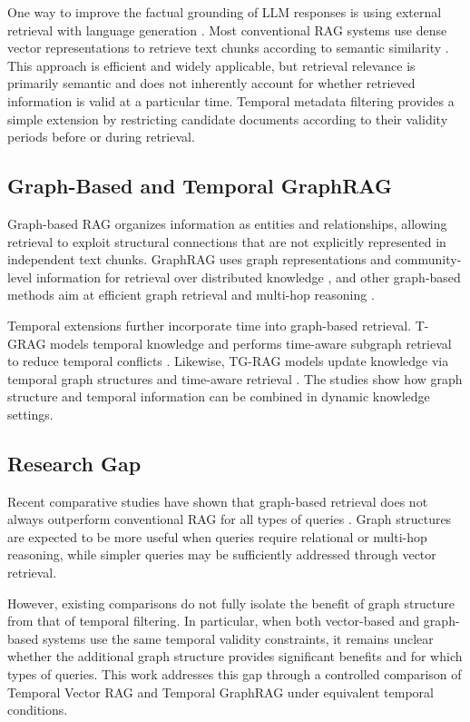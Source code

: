 \documentclass[conference]{IEEEtran}
\numberwithin{equation}{section}
\begin{document}
One way to improve the factual grounding of LLM responses is using external retrieval with language generation \cite{Lewis2020}. Most conventional RAG systems use dense vector representations to retrieve text chunks according to semantic similarity \cite{Gao2023}. This approach is efficient and widely applicable, but retrieval relevance is primarily semantic and does not inherently account for whether retrieved information is valid at a particular time. Temporal metadata filtering provides a simple extension by restricting candidate documents according to their validity periods before or during retrieval.

\subsection{Graph-Based and Temporal GraphRAG}

Graph-based RAG organizes information as entities and relationships, allowing retrieval to exploit structural connections that are not explicitly represented in independent text chunks. GraphRAG uses graph representations and community-level information for retrieval over distributed knowledge \cite{Edge2024}, and other graph-based methods aim at efficient graph retrieval and multi-hop reasoning \cite{Guo2024,Gutierrez2024}.

Temporal extensions further incorporate time into graph-based retrieval. T-GRAG models temporal knowledge and performs time-aware subgraph retrieval to reduce temporal conflicts \cite{Li2025TGRAG}. Likewise, TG-RAG models update knowledge via temporal graph structures and time-aware retrieval \cite{Han2025TGRAG}. The studies show how graph structure and temporal information can be combined in dynamic knowledge settings.

\subsection{Research Gap}

Recent comparative studies have shown that graph-based retrieval does not always outperform conventional RAG for all types of queries \cite{Xiang2025}. Graph structures are expected to be more useful when queries require relational or multi-hop reasoning, while simpler queries may be sufficiently addressed through vector retrieval.

However, existing comparisons do not fully isolate the benefit of graph structure from that of temporal filtering. In particular, when both vector-based and graph-based systems use the same temporal validity constraints, it remains unclear whether the additional graph structure provides significant benefits and for which types of queries. This work addresses this gap through a controlled comparison of Temporal Vector RAG and Temporal GraphRAG under equivalent temporal conditions.
\end{document}
